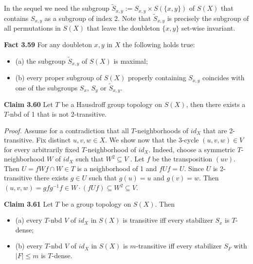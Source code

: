 \documentclass[12pt]{article}
\begin{document}
        In the sequel we need the subgroup $\tilde{S}_{x,y} := S_{x,y} \times S(\{x, y\})$ of $S(X)$ that contains $S_{x,y}$ as a subgroup of
    index 2. Note that $\tilde{S}_{x,y}$ is precisely the subgroup of all permutations in $S(X)$ that leave the doubleton $\{x, y\}$
    set-wise invariant.


    \textbf{Fact 3.59} For any doubleton $x, y$ in $X$ the following holds true:


    \begin{itemize}

        \item (a) the subgroup $\tilde{S}_{x,y}$ of $S(X)$ is maximal;

        \item (b) every proper subgroup of $S(X)$ properly containing $S_{x,y}$ coincides with one of the subgroups $S_x$, $S_y$ or $\tilde{S}_{x,y}$.

    \end{itemize}


    \textbf{Claim 3.60} Let $T$ be a Hausdroff group topology on $S(X)$, then there exists a $T$-nbd of 1 that is not 2-transitive.


        \emph{Proof.} Assume for a contradiction that all $T$-neighborhoods of $id_X$ that are 2-transitive. Fix distinct
    $u, v, w \in X$. We show now that the 3-cycle $(u, v, w) \in V$ for every arbitrarily fixed $T$-neighborhood of $id_X$. Indeed,
    choose a symmetric $T$-neighborhood $W$ of $id_X$ such that $W^2 \subseteq V$ . Let $f$ be the transposition $(uv)$. Then
    $U = fW f \cap W \in T$ is a neighborhood of 1 and $fUf = U$. Since $U$ is 2-transitive there exists $g \in U$ such that
    $g(u) = u$ and $g(v) = w$. Then $(u, v, w) = gfg^{-1}f \in W · (fUf) \subseteq W^2 \subseteq V$.


    \textbf{Claim 3.61} Let $T$ be a group topology on $S(X)$. Then


    \begin{itemize}

        \item (a)  every $T$-nbd $V$ of $id_X$ in $S(X)$ is transitive iff every stabilizer $S_x$ is $T$-dense;
        
        \item (b)  every $T$-nbd $V$ of $id_X$ in $S(X)$ is $m$-transitive iff every stabilizer $S_F$ with $|F| \leq m$ is $T$-dense.
    
    \end{itemize}
\end{document}
